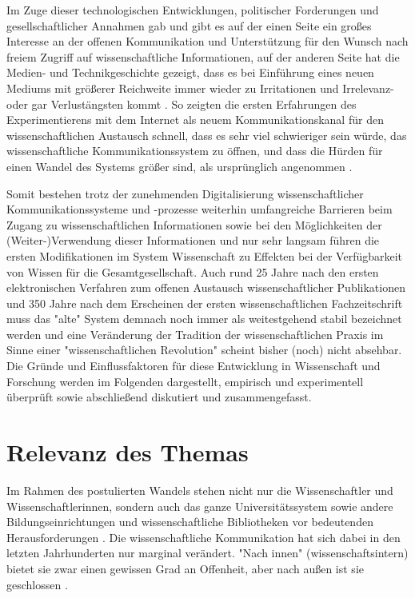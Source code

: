 Im Zuge dieser technologischen Entwicklungen, politischer Forderungen und gesellschaftlicher Annahmen gab und gibt es auf der einen Seite ein großes Interesse an der offenen Kommunikation und Unterstützung für den Wunsch nach freiem Zugriff auf wissenschaftliche Informationen, auf der anderen Seite hat die Medien- und Technikgeschichte gezeigt, dass es bei Einführung eines neuen Mediums mit größerer Reichweite immer wieder zu Irritationen \cite{Naeder_2010} und Irrelevanz- oder gar Verlustängsten kommt \cite{Hagner_2015}. So zeigten die ersten Erfahrungen des Experimentierens mit dem Internet als neuem Kommunikationskanal für den wissenschaftlichen Austausch schnell, dass es sehr viel schwieriger sein würde, das wissenschaftliche Kommunikationssystem zu öffnen, und dass die Hürden für einen Wandel des Systems größer sind, als ursprünglich angenommen \cite{Bjoerk_2004}.

Somit bestehen trotz der zunehmenden Digitalisierung wissenschaftlicher Kommunikationssysteme und -prozesse weiterhin umfangreiche Barrieren beim Zugang zu wissenschaftlichen Informationen sowie bei den Möglichkeiten der (Weiter-)Verwendung dieser Informationen und nur sehr langsam führen die ersten Modifikationen im System Wissenschaft zu Effekten bei der Verfügbarkeit von Wissen für die Gesamtgesellschaft. Auch rund 25 Jahre nach den ersten elektronischen Verfahren zum offenen Austausch wissenschaftlicher Publikationen und 350 Jahre nach dem Erscheinen der ersten wissenschaftlichen Fachzeitschrift muss das "alte" System demnach noch immer als weitestgehend stabil bezeichnet werden \cite{Brembs_2015} \cite{Hanekop_2014} \cite{Warnke_2012} und eine Veränderung der Tradition der wissenschaftlichen Praxis im Sinne einer "wissenschaftlichen Revolution" \cite{Kuhn_2012} scheint bisher (noch) nicht absehbar. Die Gründe und Einflussfaktoren für diese Entwicklung in Wissenschaft und Forschung werden im Folgenden dargestellt, empirisch und experimentell überprüft sowie abschließend diskutiert und zusammengefasst.

\section{Relevanz des Themas}

Im Rahmen des postulierten Wandels stehen nicht nur die Wissenschaftler und Wissenschaftlerinnen, sondern auch das ganze Universitätssystem sowie andere Bildungseinrichtungen und wissenschaftliche Bibliotheken vor bedeutenden Herausforderungen \cite{Mueller_2010} \cite{Harter_2006} \cite{Guedon_2004} \cite{Osterloh_2008} \cite{Beverungen_2014}. Die wissenschaftliche Kommunikation hat sich dabei in den letzten Jahrhunderten nur marginal verändert. "Nach innen" (wissenschaftsintern) bietet sie zwar einen gewissen Grad an Offenheit, aber nach außen ist sie geschlossen \cite{Kelty_2004}.

